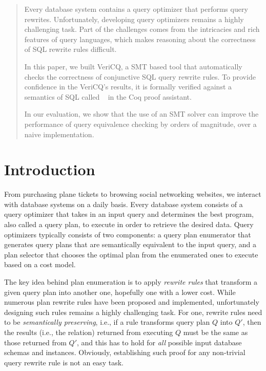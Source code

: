 \begin{abstract}
Every database system contains a query optimizer that performs query rewrites.
Unfortunately, developing query optimizers remains a highly challenging task.
Part of the challenges comes from the intricacies and rich features of query 
languages, which makes reasoning about the correctness of SQL rewrite rules difficult.

In this paper, we built VeriCQ, a SMT based tool that automatically checks 
the correctness of conjunctive SQL query rewrite rules. To provide 
confidence in the VeriCQ's results, it is formally verified against a semantics of
SQL called \sem~\cite{hottsql} in the Coq proof assistant.

In our evaluation, we show that the use of an SMT
solver can improve the performance of query equivalence checking by
orders of magnitude, over a naive implementation.
\end{abstract}

\section{Introduction}

From purchasing plane tickets to browsing social networking websites,
we interact with database systems on a daily basis. 
Every database system consists of a query optimizer that
takes in an input query and 
determines the best program, also called a query plan, to execute 
in order to retrieve the 
desired data. Query optimizers typically consists of two components:
a query plan enumerator that generates query plans that are semantically
equivalent to the input query, and a plan selector that chooses 
the optimal plan from the enumerated ones to execute
based on a cost model.

The key idea behind plan enumeration is to apply {\em rewrite rules}
that transform a given query plan into another one, hopefully one with
a lower cost.  While numerous plan rewrite rules have been proposed
and implemented, unfortunately designing such rules remains a highly
challenging task.  For one, rewrite rules need to be {\em semantically
  preserving}, i.e., if a rule transforms query plan $Q$ into $Q'$,
then the results (i.e., the relation) returned from executing $Q$ must
be the same as those returned from $Q'$, and this has to hold for {\em
  all} possible input database schemas and instances.  Obviously,
establishing such proof for any non-trivial query rewrite rule is not
an easy task.

